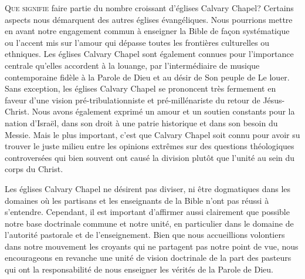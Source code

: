 
\begin{pocketpar}{}
\lettrine{Q}{ue signifie} faire partie du nombre \pocketlinebreak
 croissant d'églises Calvary Chapel?
 Certains aspects nous démarquent des autres églises évangéliques.
 Nous pourrions mettre en avant notre engagement commun à enseigner la Bible
 de façon systématique ou l'accent mis sur l'amour qui dépasse
 toutes les frontières culturelles ou ethniques.
Les églises Calvary Chapel sont également connues pour l'importance centrale
 qu'elles accordent à la louange, par l'intermédiaire de musique con\-tem\-po\-rai\-ne
 fidèle à la Parole de Dieu et au désir de Son peuple de Le louer.
 Sans exception, les églises Calvary Chapel se prononcent très fermement
 en faveur d'une vision pré-tribulationniste et pré-millénariste du retour de Jésus-Christ.
Nous avons également exprimé un amour et un soutien constants pour la nation
 d'Israël,
 dans son droit à une patrie historique et dans son besoin du Messie.
 Mais le plus important, c'est que Calvary Chapel soit connu pour avoir su trouver
 le juste milieu entre les opinions extrêmes sur des questions théologiques
 controversées qui bien souvent ont causé la division plutôt que l'unité
 au sein du corps du Christ.
\end{pocketpar}

\begin{pocketpar}{}
Les églises Calvary Chapel ne désirent pas diviser, ni être dogmatiques
 dans les domaines où les partisans et les enseignants de la Bible
 n'ont pas réussi à s'entendre.
 Cependant, il est important d'affirmer aussi clairement que possible
 notre base doctrinale commune et notre unité, en particulier dans le domaine
 de l'autorité pastorale et de l'enseignement. Bien que nous accueillions
 volontiers dans notre mouvement les croyants qui ne partagent pas notre point de vue,
 nous encourageons en revanche une unité de vision doctrinale de la part des pasteurs
 qui ont la responsabilité de nous enseigner les vérités de la Parole de Dieu.
\end{pocketpar}

